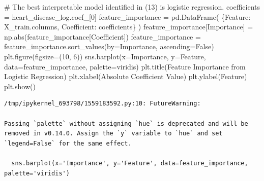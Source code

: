 \documentclass[
  11pt,
  letterpaper,
  DIV=11,
  numbers=noendperiod]{scrartcl}
\newenvironment{Shaded}{\begin{snugshade}}{\end{snugshade}}
\newcommand{\BuiltInTok}[1]{\textcolor[rgb]{0.00,0.23,0.31}{#1}}
\newcommand{\CommentTok}[1]{\textcolor[rgb]{0.37,0.37,0.37}{#1}}
\newcommand{\DecValTok}[1]{\textcolor[rgb]{0.68,0.00,0.00}{#1}}
\newcommand{\NormalTok}[1]{\textcolor[rgb]{0.00,0.23,0.31}{#1}}
\newcommand{\OperatorTok}[1]{\textcolor[rgb]{0.37,0.37,0.37}{#1}}
\newcommand{\StringTok}[1]{\textcolor[rgb]{0.13,0.47,0.30}{#1}}
\newcommand{\VariableTok}[1]{\textcolor[rgb]{0.07,0.07,0.07}{#1}}
\begin{document}
\begin{Shaded}
\begin{Highlighting}[]
\CommentTok{\# The best interpretable model identified in (13) is logistic regression.}
\NormalTok{coefficients }\OperatorTok{=}\NormalTok{ heart\_disease\_log.coef\_[}\DecValTok{0}\NormalTok{]}
\NormalTok{feature\_importance }\OperatorTok{=}\NormalTok{ pd.DataFrame(}
\NormalTok{    \{}\StringTok{\textquotesingle{}Feature\textquotesingle{}}\NormalTok{: X\_train.columns,}
     \StringTok{\textquotesingle{}Coefficient\textquotesingle{}}\NormalTok{: coefficients\}}
\NormalTok{)}
\NormalTok{feature\_importance[}\StringTok{\textquotesingle{}Importance\textquotesingle{}}\NormalTok{] }\OperatorTok{=}\NormalTok{ np.}\BuiltInTok{abs}\NormalTok{(feature\_importance[}\StringTok{\textquotesingle{}Coefficient\textquotesingle{}}\NormalTok{])}
\NormalTok{feature\_importance }\OperatorTok{=}\NormalTok{ feature\_importance.sort\_values(by}\OperatorTok{=}\StringTok{\textquotesingle{}Importance\textquotesingle{}}\NormalTok{, ascending}\OperatorTok{=}\VariableTok{False}\NormalTok{)}
\NormalTok{plt.figure(figsize}\OperatorTok{=}\NormalTok{(}\DecValTok{10}\NormalTok{, }\DecValTok{6}\NormalTok{))}
\NormalTok{sns.barplot(x}\OperatorTok{=}\StringTok{\textquotesingle{}Importance\textquotesingle{}}\NormalTok{, y}\OperatorTok{=}\StringTok{\textquotesingle{}Feature\textquotesingle{}}\NormalTok{, data}\OperatorTok{=}\NormalTok{feature\_importance, palette}\OperatorTok{=}\StringTok{\textquotesingle{}viridis\textquotesingle{}}\NormalTok{)}
\NormalTok{plt.title(}\StringTok{\textquotesingle{}Feature Importance from Logistic Regression\textquotesingle{}}\NormalTok{)}
\NormalTok{plt.xlabel(}\StringTok{\textquotesingle{}Absolute Coefficient Value\textquotesingle{}}\NormalTok{)}
\NormalTok{plt.ylabel(}\StringTok{\textquotesingle{}Feature\textquotesingle{}}\NormalTok{)}
\NormalTok{plt.show()}
\end{Highlighting}
\end{Shaded}

\begin{verbatim}
/tmp/ipykernel_693798/1559183592.py:10: FutureWarning: 

Passing `palette` without assigning `hue` is deprecated and will be removed in v0.14.0. Assign the `y` variable to `hue` and set `legend=False` for the same effect.

  sns.barplot(x='Importance', y='Feature', data=feature_importance, palette='viridis')
\end{verbatim}
\end{document}
